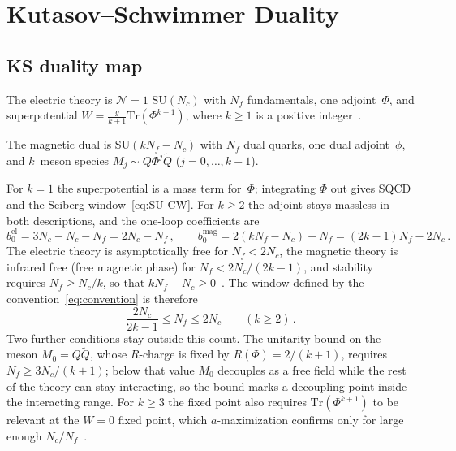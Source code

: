 \documentclass[11pt,a4paper]{article}
\theoremstyle{plain}
\theoremstyle{definition}
\theoremstyle{remark}
\newcommand{\Nc}{N_{\!c}}
\newcommand{\Nf}{N_{\!f}}
\newcommand{\SU}[1]{\mathrm{SU}(#1)}
\newcommand{\Tr}{\mathrm{Tr}}
\begin{document}
\section{Kutasov--Schwimmer Duality}
\label{sec:KS-duality}

\subsection{KS duality map}

The electric theory is $\mathcal{N}=1$ $\SU{\Nc}$ with $\Nf$
fundamentals, one adjoint~$\Phi$, and superpotential
$W = \frac{g}{k+1}\Tr(\Phi^{k+1})$, where $k \geq 1$ is a positive
integer~\cite{KS9505004,KSS9507040}.

The magnetic dual is $\SU{k\Nf - \Nc}$ with $\Nf$ dual quarks, one
dual adjoint~$\phi$, and $k$~meson species $M_j \sim Q\Phi^j
\widetilde{Q}$ ($j = 0, \ldots, k-1$).

For $k = 1$ the superpotential is a mass term for~$\Phi$; integrating
$\Phi$ out gives SQCD and the Seiberg window~\eqref{eq:SU-CW}.  For
$k \geq 2$ the adjoint stays massless in both descriptions, and the
one-loop coefficients are
\begin{equation}\label{eq:KS-b0}
  b_0^{\mathrm{el}} = 3\Nc - \Nc - \Nf = 2\Nc - \Nf\,,
  \qquad
  b_0^{\mathrm{mag}} = 2(k\Nf - \Nc) - \Nf = (2k - 1)\Nf - 2\Nc\,.
\end{equation}
The electric theory is asymptotically free for $\Nf < 2\Nc$, the magnetic
theory is infrared free (free magnetic phase) for $\Nf < 2\Nc/(2k - 1)$,
and stability requires $\Nf \geq \Nc/k$, so that
$k\Nf - \Nc \geq 0$~\cite{KS9505004,KSS9507040}.  The window defined by
the convention~\eqref{eq:convention} is therefore
\begin{equation}\label{eq:KS-CW}
  \frac{2\Nc}{2k - 1} \leq \Nf \leq 2\Nc
  \qquad (k \geq 2)\,.
\end{equation}
Two further conditions stay outside this count.  The unitarity bound on
the meson $M_0 = Q\widetilde{Q}$, whose $R$-charge is fixed by
$R(\Phi) = 2/(k+1)$, requires $\Nf \geq 3\Nc/(k+1)$; below that value
$M_0$ decouples as a free field while the rest of the theory can stay
interacting, so the bound marks a decoupling point inside the
interacting range.  For $k \geq 3$ the fixed point also requires
$\Tr(\Phi^{k+1})$ to be relevant at the $W = 0$ fixed point, which
$a$-maximization confirms only for large enough
$\Nc/\Nf$~\cite{IW2003}.
\end{document}
